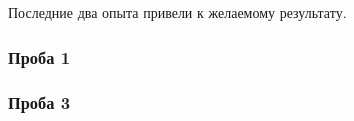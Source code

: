 \def\svgwidth{\linewidth}
\def\svgwidth{\linewidth}
\def\svgwidth{\linewidth}
\def\svgwidth{\linewidth}

Последние два опыта привели к желаемому результату.

\subsubsection{Проба 1}
\def\svgwidth{\linewidth}

\subsubsection{Проба 3}
\def\svgwidth{\linewidth}

